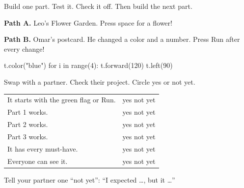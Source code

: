 \begin{exercise}
Build one part. Test it. Check it off. Then build the next part.

\textbf{Path A.} Leo's Flower Garden. Press space for a flower!
\begin{center}
\begin{scratch}[scale=0.75]
\end{scratch}
\quad
\begin{scratch}[scale=0.75]
\end{scratch}
\end{center}

\textbf{Path B.} Omar's postcard. He changed a color and a number. Press Run after every change!

\noindent\begin{minipage}{\linewidth}
\begin{pycode}
t.color("blue")
for i in range(4):
    t.forward(120)
    t.left(90)
\end{pycode}
\end{minipage}
\end{exercise}

\begin{exercise}
Swap with a partner. Check their project. Circle yes or not yet.
\begin{center}
\begin{tabular}{@{}l c@{}}
It starts with the green flag or Run. & yes \quad not yet\\
Part 1 works. & yes \quad not yet\\
Part 2 works. & yes \quad not yet\\
Part 3 works. & yes \quad not yet\\
It has every must-have. & yes \quad not yet\\
Everyone can see it. & yes \quad not yet\\
\end{tabular}
\end{center}
Tell your partner one \enquote{not yet}: \enquote{I expected \ldots, but it \ldots}
\end{exercise}

